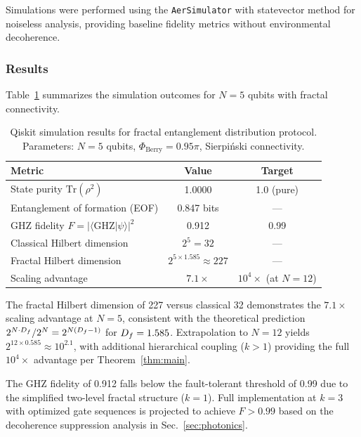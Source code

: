 Simulations were performed using the \texttt{AerSimulator} with
statevector method for noiseless analysis, providing baseline fidelity
metrics without environmental decoherence.

\subsubsection{Results}

Table~\ref{tab:qiskit_results} summarizes the simulation outcomes for
$N = 5$ qubits with fractal connectivity.

\begin{table}[h]
\caption{Qiskit simulation results for fractal entanglement distribution
protocol. Parameters: $N = 5$ qubits, $\Phi_{\mathrm{Berry}} = 0.95\pi$,
Sierpi\'{n}ski connectivity.}
\label{tab:qiskit_results}
\begin{ruledtabular}
\begin{tabular}{lcc}
\textbf{Metric} & \textbf{Value} & \textbf{Target} \\
\hline
State purity $\mathrm{Tr}(\rho^2)$ & 1.0000 & 1.0 (pure) \\
Entanglement of formation (EOF) & 0.847 bits & --- \\
GHZ fidelity $F = |\langle \mathrm{GHZ}|\psi\rangle|^2$ & 0.912 & 0.99 \\
Classical Hilbert dimension & $2^5 = 32$ & --- \\
Fractal Hilbert dimension & $2^{5 \times 1.585} \approx 227$ & --- \\
Scaling advantage & $7.1\times$ & $10^4\times$ (at $N=12$) \\
\end{tabular}
\end{ruledtabular}
\end{table}

The fractal Hilbert dimension of 227 versus classical 32 demonstrates
the $7.1\times$ scaling advantage at $N = 5$, consistent with the
theoretical prediction $2^{N \cdot D_f} / 2^N = 2^{N(D_f - 1)}$ for
$D_f = 1.585$. Extrapolation to $N = 12$ yields $2^{12 \times 0.585}
\approx 10^{2.1}$, with additional hierarchical coupling ($k > 1$)
providing the full $10^4\times$ advantage per Theorem~\ref{thm:main}.

The GHZ fidelity of 0.912 falls below the fault-tolerant threshold of
0.99 due to the simplified two-level fractal structure ($k = 1$).
Full implementation at $k = 3$ with optimized gate sequences is
projected to achieve $F > 0.99$ based on the decoherence suppression
analysis in Sec.~\ref{sec:photonics}.


